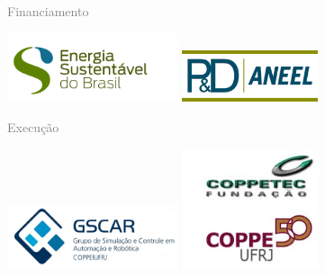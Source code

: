 %
%
%
%
\pagestyle{fancy}%
\thispagestyle{fancy}%
\renewcommand{\headrulewidth}  {0.4pt}%
\renewcommand{\footrulewidth}  {0.4pt}%
%
\chead{}%
\rhead{}%
\lfoot{}%
\cfoot{}%
\rfoot{\sf [\hours] \quad \today}%
\vspace*{20mm}%

{\grande \textcolor{gray}{Financiamento}}

\vspace{-15mm}%
\hspace{50mm}%
\includegraphics[width=50mm]{logo/esbr-logo.png}
\hspace{10mm}%
\includegraphics[width=40mm]{logo/aneel-logo.jpg}

\vspace{35mm}%
{\grande \textcolor{gray}{Execução}}

\vspace{-25mm}%
\hspace{50mm}%
\includegraphics[width=50mm]{logo/gscar-logo.png}
\hspace{10mm}%
\includegraphics[width=40mm]{logo/coppetec50-logo.jpg}

